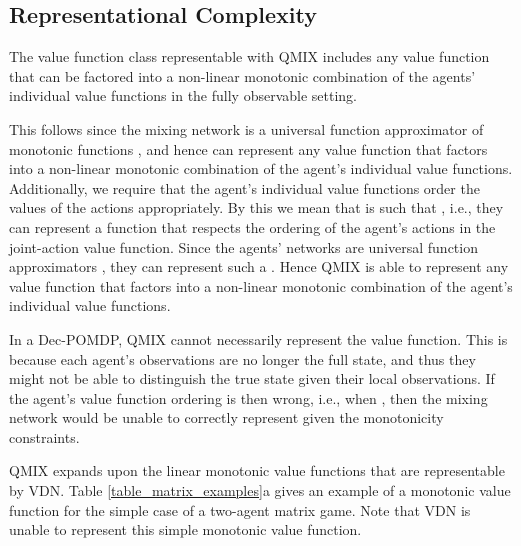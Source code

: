 \documentclass{article}
\begin{document}
\subsection{Representational Complexity}

The value function class representable with QMIX includes any value function that can be factored into a non-linear monotonic combination of the agents' individual value functions in the fully observable setting. 

This follows since the mixing network is a universal function approximator of monotonic functions \cite{Dugas_2009}, and hence can represent any value function that factors into a non-linear monotonic combination of the agent's individual value functions. Additionally, we require that the agent's individual value functions order the values of the actions appropriately. By this we mean that  is such that , i.e., they can represent a function that respects the ordering of the agent's actions in the joint-action value function. Since the agents' networks are universal function approximators \cite{pinkus1999approximation}, they can represent such a . Hence QMIX is able to represent any value function that factors into a non-linear monotonic combination of the agent's individual value functions. 

In a Dec-POMDP, QMIX cannot necessarily represent the value function. This is because each agent's observations are no longer the full state, and thus they might not be able to distinguish the true state given their local observations. If the agent's value function ordering is then wrong, i.e.,  when , then the mixing network would be unable to correctly represent  given the monotonicity constraints. 

QMIX expands upon the linear monotonic value functions that are representable by VDN. Table \ref{table_matrix_examples}a gives an example of a monotonic value function for the simple case of a two-agent matrix game. Note that VDN is unable to represent this simple monotonic value function.
\end{document}
